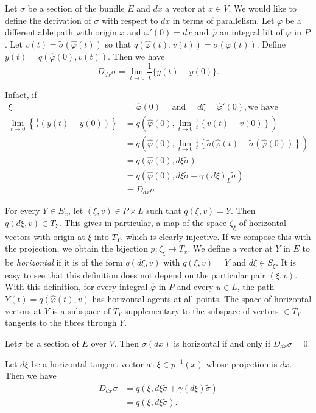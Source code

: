 Let $\sigma$ be a section of the bundle $E$ and $dx$ a vector at $ x
\in V$. We would like to define the derivation of $\sigma$ with
respect to $dx$ in terms of parallelism. Let $\varphi$ be a
differentiable path with origin $x$ and $\varphi '(0) = dx$ and
$\hat{\varphi}$ an integral lift of $\varphi$ in $P$. 
Let $v(t) = \tilde{\sigma}(\hat{\varphi}(t))$ so that
$q(\hat{\varphi}(t), v(t)) = \sigma (\varphi(t))$. Define $y(t) =
q(\hat{\varphi}(0), v(t))$. Then we have 
$$
D_{dx} \sigma = \lim_{t \to 0} \frac{1}{t} \{y(t)-y(0)\}. 
$$

In\pageoriginale fact, if
\begin{align*}
  \xi &= \hat{\varphi} (0)\quad \text{ and
  }\quad d \xi = \hat{\varphi}' (0), \text{we have}\\ 
  \lim_{t \to 0} \left\{ \frac{1}{t} (y(t)-y(0))\right\} & = q(\hat{\varphi}(0),
  \lim_{t \to 0} \frac{1}{t} \left\{ v(t) - v(0)\right\} )\\ 
  & =  q(\hat{\varphi}(0), \lim_{t \to 0} \frac{1}{t} \left\{
  \tilde{\sigma}(\hat{\varphi}(t) - \tilde{\sigma}(\hat{\varphi}(0))\right\}
  )\\ 
  & = q(\hat{\varphi}(0), d \xi \tilde{\sigma})\\
  & = q(\hat{\varphi}(0), d \xi \tilde{\sigma} + \gamma (d \xi )_L
  \tilde{\sigma})\\ 
  & = D_{dx} \sigma. 
\end{align*}

For every $Y \in E_x$, let $(\xi, v) \in P \times L$ such that $q(\xi
, v)  = Y$. Then $q(d \xi , v) \in T_Y$. This gives in particular, a
map of the space $\zeta_\xi$ of horizontal vectors with origin at
$\xi$ into $T_Y$, which is clearly injective. If we compose this with
the projection, we obtain the bijection $p : \zeta_\xi \to T_x$. We
define a vector at $Y$ in $E$ to be \textit{horizontal} if it is of
the form $q(d \xi , v)$ with $q(\xi , v) = Y$ and $d \xi \in
S_\xi$. It is easy to see that this definition does not depend on the
particular pair $(\xi , v)$. With this definition, for every integral
$\hat{\varphi}$ in $P$ and every $ u \in L$, the path $Y(t) = q
(\hat{\varphi} (t), v)$ has horizontal agents at all points. The
space of horizontal vectors at $Y$ is a subspace of $T_Y$
supplementary to the subspace of vectors $\in T_Y$ tangents to the
fibres through $Y$. 

\begin{theorem}\label{chap5:sec7:thm5}%
  Let\pageoriginale $\sigma$ be a section of $E$ over $V$. Then $\sigma(dx)$ is
  horizontal if and only if $D_{dx} \sigma = 0$. 

  Let $d \xi $ be a horizontal tangent vector at $\xi \in p^{-1}(x)$
  whose projection is $dx$. Then we have 
  \begin{align*}
    D_{dx} \sigma &= q (\xi , d \xi \tilde{\sigma} + \gamma (d \xi)
    \tilde{\sigma})\\ 
    & = q(\xi , d \xi \tilde{\sigma}).
  \end{align*}
\end{theorem}

